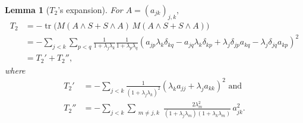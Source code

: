 \documentclass[10pt,a4paper]{amsart}
\newtheorem{lemma}{Lemma}
\newcommand{\pr}[1]{\left(#1\right)}
\begin{document}
\begin{lemma}[$T_2$'s expansion]
	\label{lem:T2}
	For $A=(a_{jk})_{j,k},$
	\begin{align*}T_2
	&= - \operatorname{tr}\big(M (A \wedge S + S \wedge A)\, M (A \wedge S + S \wedge A)\big)\\
	&=- \sum_{j<k}\sum_{p<q}
	\frac 1{1+\lambda_j\lambda_k}
	\frac 1{1+\lambda_p\lambda_q}
	\pr{a_{jp}\lambda_k\delta_{kq} - a_{jq}\lambda_k\delta_{kp}
		+ \lambda_j\delta_{jp}a_{kq}
		- \lambda_j\delta_{jq}a_{kp}}^2\\
	&=T_2'+T_2'',
	\end{align*}
	where 
	\begin{align*}T_2'&=- \sum_{j<k}
	\frac 1{(1+\lambda_j\lambda_k)^2} 
	\pr{\lambda_k a_{jj}
		+ \lambda_j a_{kk}
	}^2\text{ and}\\
	T_2''
	&=-\sum_{j<k}\sum_{\substack{m\neq j,k}}
	\frac{2\lambda_m^2}
	{(1+\lambda_j\lambda_m)(1+\lambda_k\lambda_m)}
	\, a_{jk}^2.
	\end{align*}
\end{lemma}
\end{document}
